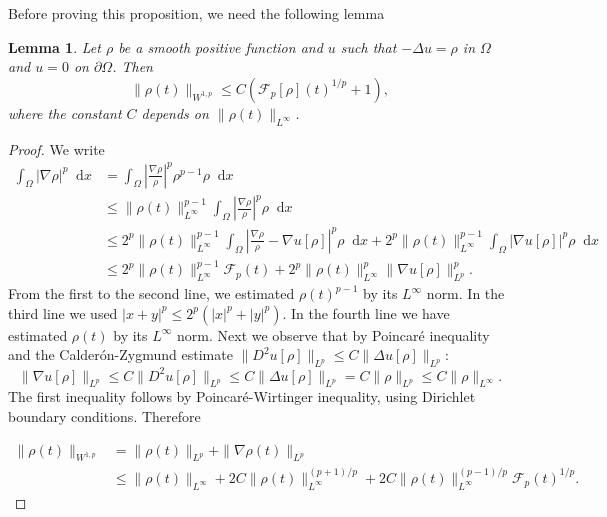 \documentclass[a4paper,twosided, 11pt]{article}
\renewcommand{\color}[2][]{}
\newcommand {\f}   {\frac}
\theoremstyle{plain}
\newtheorem{lemma}[thm]{Lemma}
\theoremstyle{remark}
\newcommand{\diff}{\mathop{}\!\mathrm{d}}
\numberwithin{equation}{section}
\begin{document}
Before proving this proposition, we need the following lemma
\begin{lemma}\label{lem:rho_W1p}
Let $\rho$ be a {\color{blue}smooth positive function and $u$ such that $-\Delta u =\rho$ in $\Omega$ and $u=0$ on $\partial\Omega$}. Then
$$
\|\rho(t)\|_{W^{1,p}}\le C (\mathcal{F}_{p}[\rho](t)^{1/p} +1),
$$
where the constant $C$ depends on $\|\rho(t)\|_{L^{\infty}}$.
\end{lemma}

\begin{proof}
We write 
\begin{align*}
\int_{\Omega} |\nabla \rho|^{p}\diff x&= \int_{\Omega} \left|\f{\nabla\rho}{\rho}\right|^{p}\rho^{p-1}\rho\diff x\\
&\le \|\rho(t)\|_{L^{\infty}}^{p-1}\int_{\Omega} \left|\f{\nabla\rho}{\rho}\right|^{p}\rho \diff x\\
& \le 2^p\|\rho(t)\|_{L^{\infty}}^{p-1}\int_{\Omega} \left|\f{\nabla\rho}{\rho} - \nabla u[\rho]\right|^{p}\rho \diff x+ 2^p\|\rho(t)\|_{L^{\infty}}^{p-1} \int_{\Omega} |\nabla u[\rho]|^{p}\rho\diff x\\
&\le 2^p\|\rho(t)\|_{L^{\infty}}^{p-1} \mathcal{F}_{p}(t) + 2^p \|\rho(t)\|_{L^{\infty}}^{p} \|\nabla u[\rho]\|_{L^{p}}^{p}.
\end{align*}
From the first to the second line, we estimated $\rho(t)^{p-1}$ by its $L^{\infty}$ norm. In the third line we used $|x+y|^p \le 2^{p}(|x|^{p} + |y|^{p})$. In the fourth line we have estimated $\rho(t)$ by its $L^{\infty}$ norm.
Next we observe  that by Poincaré inequality and the Calderón-Zygmund estimate $\|D^{2}u[\rho]\|_{L^{p}}\le C\|\Delta u[\rho]\|_{L^{p}}$: 
$$
\|\nabla u[\rho]\|_{L^{p}}\le C\|D^{2}u[\rho]\|_{L^{p}} \le C\|\Delta u[\rho]\|_{L^{p}} = C\|\rho\|_{L^{p}}\le C \|\rho\|_{L^{\infty}}.
$$
{\color{blue}The first inequality follows by Poincaré-Wirtinger inequality, using Dirichlet boundary conditions.}
Therefore 

\begin{align*}
\|\rho(t)\|_{W^{1,p}} &= \|\rho(t)\|_{L^p} + \|\nabla \rho(t)\|_{L^{p}}\\
&\le \|\rho(t)\|_{L^\infty} + 2C \|\rho(t)\|_{L^\infty}^{(p+1)/p} + 2C \|\rho(t)\|_{L^\infty}^{(p-1)/p}\mathcal{F}_{p}(t)^{1/p}.
\end{align*}
\end{proof}
\end{document}
